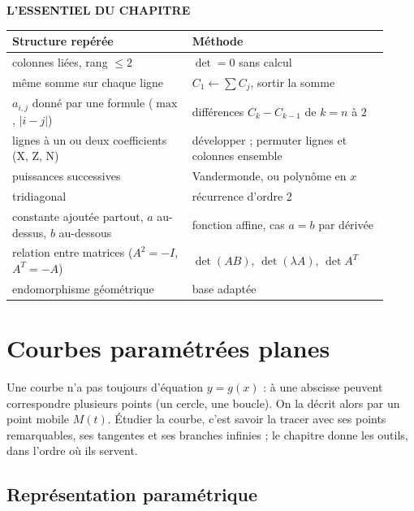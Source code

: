 \documentclass[a4paper,11pt]{article}
\numberwithin{equation}{section}
\numberwithin{figure}{section}
\numberwithin{table}{section}
\theoremstyle{enonce}
\theoremstyle{exemple}
\theoremstyle{remarque}
\newenvironment{essentiel}{\par\needspace{12\baselineskip}\vspace{1.5em}%
  \begin{tcolorbox}[enhanced,unbreakable,colback=white,colframe=white,boxrule=0pt,arc=0pt,
   borderline north={1.4pt}{0pt}{Ocre},left=2pt,right=2pt,top=8pt,bottom=4pt]
  {\sffamily\bfseries\color{Ocre}L'ESSENTIEL DU CHAPITRE}\par\medskip}{\end{tcolorbox}}
\begin{document}
\begin{essentiel}
\small
\begin{tabular}{>{\raggedright}p{0.44\linewidth}p{0.48\linewidth}}
Structure repérée & Méthode\\\midrule
colonnes liées, rang $\leq2$ & $\det=0$ sans calcul\\
même somme sur chaque ligne & $C_1\leftarrow\sum C_j$, sortir la somme\\
$a_{i,j}$ donné par une formule ($\max$, $|i-j|$) & différences $C_k-C_{k-1}$ de $k=n$ à $2$\\
lignes à un ou deux coefficients (X, Z, N) & développer ; permuter lignes et colonnes ensemble\\
puissances successives & Vandermonde, ou polynôme en $x$\\
tridiagonal & récurrence d'ordre 2\\
constante ajoutée partout, $a$ au-dessus, $b$ au-dessous & fonction affine, cas $a=b$ par dérivée\\
relation entre matrices ($A^2=-I$, $A^T=-A$) & $\det(AB)$, $\det(\lambda A)$, $\det A^T$\\
endomorphisme géométrique & base adaptée
\end{tabular}
\end{essentiel}
\clearpage
\section{Courbes paramétrées planes}\label{sec:courbes}

Une courbe n'a pas toujours d'équation $y=g(x)$ : à une abscisse peuvent correspondre plusieurs points (un cercle, une
boucle). On la décrit alors par un point mobile $M(t)$. Étudier la courbe, c'est savoir la tracer avec ses points
remarquables, ses tangentes et ses branches infinies ; le chapitre donne les outils, dans l'ordre où ils servent.

\subsection{Représentation paramétrique}
\end{document}
